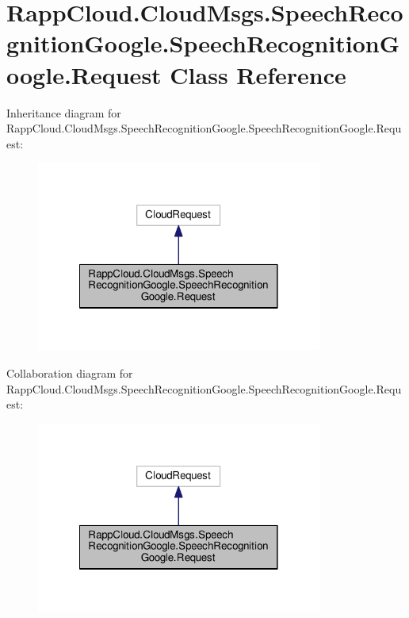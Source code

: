 \hypertarget{classRappCloud_1_1CloudMsgs_1_1SpeechRecognitionGoogle_1_1SpeechRecognitionGoogle_1_1Request}{\section{Rapp\-Cloud.\-Cloud\-Msgs.\-Speech\-Recognition\-Google.\-Speech\-Recognition\-Google.\-Request Class Reference}
\label{classRappCloud_1_1CloudMsgs_1_1SpeechRecognitionGoogle_1_1SpeechRecognitionGoogle_1_1Request}
}


Inheritance diagram for Rapp\-Cloud.\-Cloud\-Msgs.\-Speech\-Recognition\-Google.\-Speech\-Recognition\-Google.\-Request\-:
\nopagebreak
\begin{figure}[H]
\begin{center}
\leavevmode
\includegraphics[width=266pt]{classRappCloud_1_1CloudMsgs_1_1SpeechRecognitionGoogle_1_1SpeechRecognitionGoogle_1_1Request__inherit__graph}
\end{center}
\end{figure}


Collaboration diagram for Rapp\-Cloud.\-Cloud\-Msgs.\-Speech\-Recognition\-Google.\-Speech\-Recognition\-Google.\-Request\-:
\nopagebreak
\begin{figure}[H]
\begin{center}
\leavevmode
\includegraphics[width=266pt]{classRappCloud_1_1CloudMsgs_1_1SpeechRecognitionGoogle_1_1SpeechRecognitionGoogle_1_1Request__coll__graph}
\end{center}
\end{figure}
